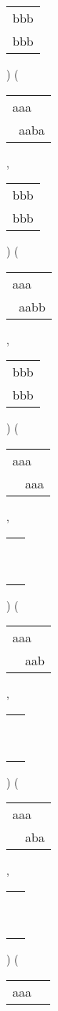 \begin{description}
\begin{tabular}{|l|}
bbb \\
bbb \\
\hline
\end{tabular} 
) 
 ( 
\begin{tabular}{|l|} \hline
aaa\ \  \\
\ aaba \\
\hline
\end{tabular} 
 , 
\begin{tabular}{|l|} \hline
bbb \\
bbb \\
\hline
\end{tabular} 
) 
 ( 
\begin{tabular}{|l|} \hline
aaa\ \  \\
\ aabb \\
\hline
\end{tabular} 
 , 
\begin{tabular}{|l|} \hline
bbb \\
bbb \\
\hline
\end{tabular} 
) 
 ( 
\begin{tabular}{|l|} \hline
aaa\ \  \\
\ \ aaa \\
\hline
\end{tabular} 
 , 
\begin{tabular}{|l|} \hline
\ \\ \ \\ \hline
\end{tabular} 
) 
 ( 
\begin{tabular}{|l|} \hline
aaa\ \  \\
\ \ aab \\
\hline
\end{tabular} 
 , 
\begin{tabular}{|l|} \hline
\ \\ \ \\ \hline
\end{tabular} 
) 
 ( 
\begin{tabular}{|l|} \hline
aaa\ \  \\
\ \ aba \\
\hline
\end{tabular} 
 , 
\begin{tabular}{|l|} \hline
\ \\ \ \\ \hline
\end{tabular} 
) 
 ( 
\begin{tabular}{|l|} \hline
aaa\ \  \\

\end{tabular}
\end{description}
